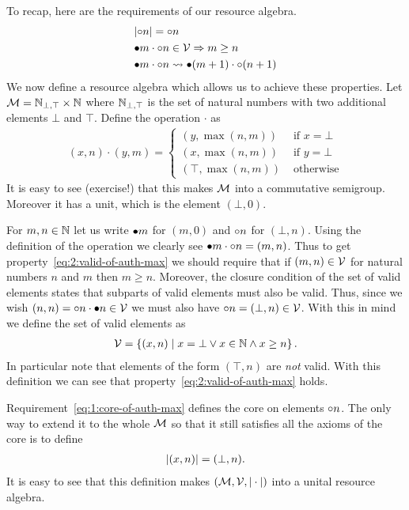 To recap, here are the requirements of our resource algebra.
\begin{align}
  \label{eq:1:core-of-auth-max}
  &{\mid}\mathord{\circ} n{\mid} = \mathord{\circ}{n}\\
  \label{eq:2:valid-of-auth-max}
  &\mathord{\bullet} m \cdot \mathord{\circ} n \in \mathcal{V} \Rightarrow m \geq n\\
  \label{eq:3:valid-update-auth-max}
  &\mathord{\bullet} m \cdot \mathord{\circ} n \rightsquigarrow \mathord{\bullet} (m+1) \cdot \mathord{\circ} (n+1)
\end{align}
We now define a resource algebra which allows us to achieve these properties.
Let $\mathcal{M} = \mathbb{N}_{\bot,\top} \times \mathbb{N}$ where $\mathbb{N}_{\bot,\top}$ is the set of natural numbers with two additional elements $\bot$ and $\top$.
Define the operation $\cdot$ as
\begin{align*}
  (x, n) \cdot (y, m) =
  \begin{cases}
    (y, \max(n, m)) & \text{ if } x = \bot\\
    (x, \max(n, m)) & \text{ if } y = \bot\\
    (\top, \max(n, m)) & \text{ otherwise}
  \end{cases}
\end{align*}
It is easy to see (exercise!) that this makes $\mathcal{M}$ into a commutative semigroup.
Moreover it has a unit, which is the element $(\bot, 0)$.

For $m, n \in \mathbb{N}$ let us write $\mathord{\bullet} m$ for $(m, 0)$ and $\mathord{\circ} n$ for $(\bot, n)$.
Using the definition of the operation we clearly see $\mathord{\bullet} m \cdot \mathord{\circ} n = (m, n)$.
Thus to get property~\eqref{eq:2:valid-of-auth-max} we should require that if $(m, n) \in \mathcal{V}$ for natural numbers $n$ and $m$ then $m \geq n$.
Moreover, the closure condition of the set of valid elements states that subparts of valid elements must also be valid.
Thus, since we wish $(n, n) = \mathord{\circ} n \cdot \mathord{\bullet} n \in \mathcal{V}$ we must also have $\mathord{\circ} n = (\bot, n) \in \mathcal{V}$.
With this in mind we define the set of valid elements as
\begin{align*}
  \Vl = \left\{(x, n) \isetsep x = \bot \lor x \in \NN \land x \geq n\right\}.
\end{align*}
In particular note that elements of the form $(\top, n)$ are \emph{not} valid.
With this definition we can see that property~\eqref{eq:2:valid-of-auth-max} holds.

Requirement~\eqref{eq:1:core-of-auth-max} defines the core on elements $\mathord{\circ} n$.
The only way to extend it to the whole $\mathcal{M}$ so that it still satisfies all the axioms of the core is to define
\begin{align*}
  {\mid}(x, n){\mid} = (\bot, n).
\end{align*}
It is easy to see that this definition makes $(\mathcal{M}, \mathcal{V}, {\mid}\cdot{\mid})$ into a unital resource algebra.

